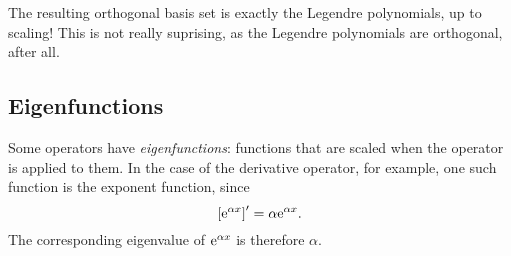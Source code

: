 The resulting orthogonal basis set is exactly the Legendre polynomials, up to scaling! This is not really suprising, as the Legendre polynomials are orthogonal, after all.

\subsection{Eigenfunctions}
Some operators have \emph{eigenfunctions}: functions that are scaled when the operator is applied to them. In the case of the derivative operator, for example, one such function is the exponent function, since
\begin{equation}
	\left[ \mathrm{e}^{\alpha x} \right]' = \alpha \mathrm{e}^{\alpha x}.
	\label{eq:exponent_derivative_fspace}
\end{equation}
The corresponding eigenvalue of $\mathrm{e}^{\alpha x}$ is therefore $\alpha$.
